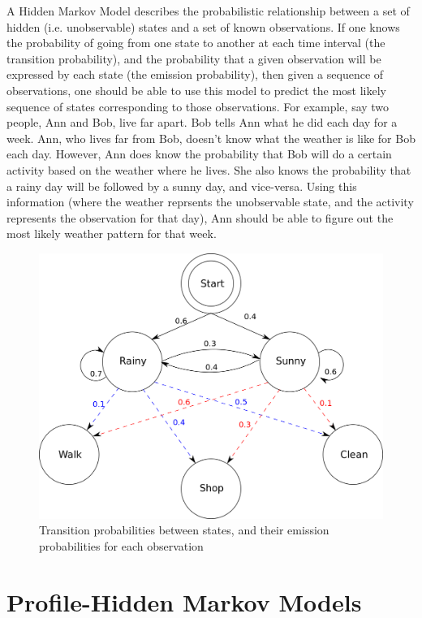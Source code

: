 \documentclass{article}
\begin{document}
A Hidden Markov Model describes the probabilistic relationship between a set of hidden (i.e. unobservable) states and a set of known observations. If one knows the probability of going from one state to another at each time interval (the transition probability), and the probability that a given observation will be expressed by each state (the emission probability), then given a sequence of observations, one should be able to use this model to predict the most likely sequence of states corresponding to those observations. For example, say two people, Ann and Bob, live far apart. Bob tells Ann what he did each day for a week. Ann, who lives far from Bob, doesn't know what the weather is like for Bob each day. However, Ann does know the probability that Bob will do a certain activity based on the weather where he lives. She also knows the probability that a rainy day will be followed by a sunny day, and vice-versa. Using this information (where the weather reprsents the unobservable state, and the activity represents the observation for that day), Ann should be able to figure out the most likely weather pattern for that week.
\begin{figure}[H]
\centering
\includegraphics[width=.5\textwidth]{materials/HMMGraph.png}
\caption{Transition probabilities between states, and their emission probabilities for each observation\footnotemark[2]}
\end{figure}


\section{Profile-Hidden Markov Models}
\end{document}
